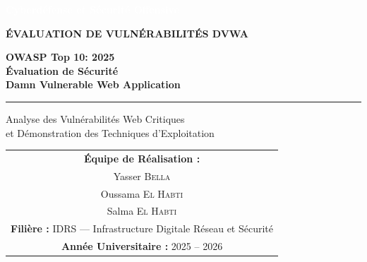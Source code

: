 \documentclass[12pt,a4paper,openany]{report}
\begin{document}
	\sloppy
	
	\begin{titlepage}
		\thispagestyle{empty}
		
		\noindent
		\colorbox{primary}{%
			\parbox{\dimexpr\textwidth-2\fboxsep}{%
				\vspace{0.6cm}
				\centering
				{\large\bfseries\textcolor{white}{Cyberdéfense et Sécurité Offensive}}\\[0.6cm]
			}%
		}
		
		\vspace{1.5cm}
		\centering
		
		{\normalsize\bfseries\color{black!40}\MakeUppercase{Évaluation de Vulnérabilités DVWA}}
		
		\vspace{0.8cm}
		
		{\Huge\bfseries\color{primary}
			OWASP Top 10: 2025\\
			Évaluation de Sécurité\\
			Damn Vulnerable Web Application\par
		}
		
		\vspace{0.5cm}
		
		{\color{accent}\rule{7cm}{1.5pt}\par}
		
		\vspace{0.5cm}
		
		{\large\color{black!60}
			Analyse des Vulnérabilités Web Critiques\\[0.2cm]
			et Démonstration des Techniques d'Exploitation\par
		}
		
		\vspace{2cm}
		
		{\large
			\renewcommand{\arraystretch}{1.5}
			\begin{tabular}{c}
				\textbf{\color{primary}Équipe de Réalisation :}\\[0.3cm]
				Yasser \textsc{Bella} \\
				Oussama \textsc{El Habti} \\
				Salma \textsc{El Habti} \\[0.6cm]
				
				\textbf{\color{primary}Filière :} IDRS --- Infrastructure Digitale Réseau et Sécurité \\[0.3cm]
				\textbf{\color{primary}Année Universitaire :} 2025 -- 2026 \\
			\end{tabular}
		}
		

\end{titlepage}
\end{document}
